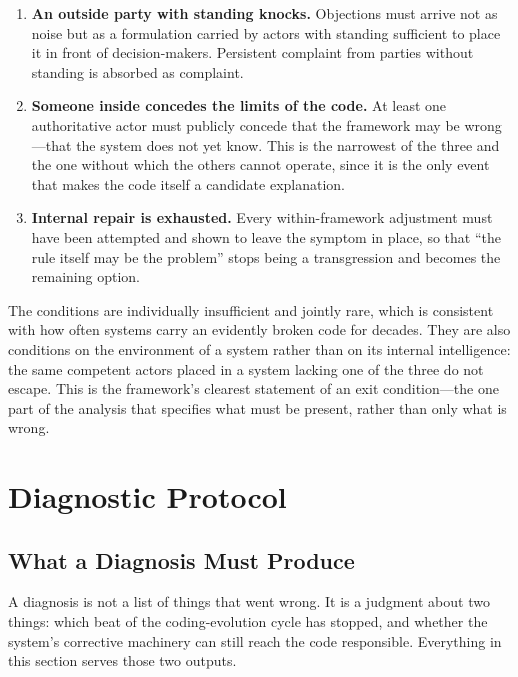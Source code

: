 \documentclass[11pt,a4paper]{article}
\begin{document}
\begin{enumerate}
    \item \textbf{An outside party with standing knocks.} Objections must arrive not as noise but as a formulation carried by actors with standing sufficient to place it in front of decision-makers. Persistent complaint from parties without standing is absorbed as complaint.
    \item \textbf{Someone inside concedes the limits of the code.} At least one authoritative actor must publicly concede that the framework may be wrong---that the system does not yet know. This is the narrowest of the three and the one without which the others cannot operate, since it is the only event that makes the code itself a candidate explanation.
    \item \textbf{Internal repair is exhausted.} Every within-framework adjustment must have been attempted and shown to leave the symptom in place, so that ``the rule itself may be the problem'' stops being a transgression and becomes the remaining option.
\end{enumerate}

The conditions are individually insufficient and jointly rare, which is consistent with how often systems carry an evidently broken code for decades. They are also conditions on the environment of a system rather than on its internal intelligence: the same competent actors placed in a system lacking one of the three do not escape. This is the framework's clearest statement of an exit condition---the one part of the analysis that specifies what must be present, rather than only what is wrong.

\section{Diagnostic Protocol}

\subsection{What a Diagnosis Must Produce}

A diagnosis is not a list of things that went wrong. It is a judgment about two things: which beat of the coding-evolution cycle has stopped, and whether the system's corrective machinery can still reach the code responsible. Everything in this section serves those two outputs.
\end{document}
